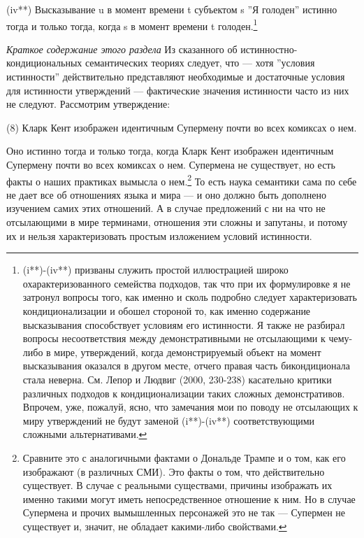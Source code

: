 \documentclass[11pt]{book}
\begin{document}
(iv**) Высказывание u в момент времени t субъектом s ''Я голоден'' истинно тогда и только тогда, когда s в момент времени t голоден.\footnote{(i**)-(iv**) призваны служить простой иллюстрацией широко охарактеризованного семейства подходов, так что при их формулировке я не затронул вопросы того, как именно и сколь подробно следует характеризовать кондиционализации и обошел стороной то, как именно содержание высказывания способствует условиям его истинности. Я также не разбирал вопросы несоответствия между демонстративными не отсылающими к чему-либо в мире, утверждений, когда демонстрируемый объект на момент высказывания оказался в другом месте, отчего правая часть бикондиционала стала неверна. См. Лепор и Людвиг (2000, 230-238) касательно критики различных подходов к кондиционализации таких сложных демонстративов. Впрочем, уже, пожалуй, ясно, что замечания мои по поводу не отсылающих к миру утверждений не будут заменой (i**)-(iv**) соответствующими сложными альтернативами.}

\smallskip

\textit{Краткое содержание этого раздела} \quad Из сказанного об истинностно-кондициональных семантических теориях следует, что --- хотя ''условия истинности'' действительно представляют необходимые и достаточные условия для истинности утверждений --- фактические значения истинности часто из них не следуют. Рассмотрим утверждение:

\smallskip

(8) Кларк Кент изображен идентичным Супермену почти во всех комиксах о нем.

\smallskip

Оно истинно тогда и только тогда, когда Кларк Кент изображен идентичным Супермену почти во всех комиксах о нем. Супермена не существует, но есть факты о наших практиках вымысла о нем.\footnote{Сравните это с аналогичными фактами о Дональде Трампе и о том, как его изображают (в различных СМИ). Это факты о том, что действительно существует. В случае с реальными существами, причины изображать их именно такими могут иметь непосредственное отношение к ним. Но в случае Супермена и прочих вымышленных персонажей это не так --- Супермен не существует и, значит, не обладает какими-либо свойствами.} То есть наука семантики сама по себе не дает все об отношениях языка и мира --- и оно должно быть дополнено изучением самих этих отношений. А в случае предложений с ни на что не отсылающими в мире терминами, отношения эти сложны и запутаны, и потому их и нельзя характеризовать простым изложением условий истинности.
\end{document}
